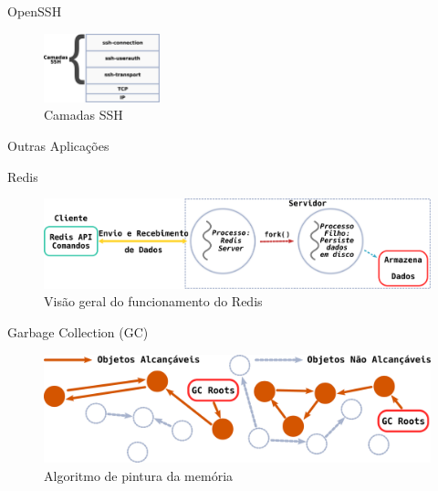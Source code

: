 \documentclass[xcolor={usenames,svgnames,dvipsnames},brazil,english,12pt,aspectratio=149]{beamer}
\begin{document}
\begin{frame}{OpenSSH}
	\begin{figure}[!h]
		\centering
		\includegraphics[width=0.3\textwidth]{ssh_layers}
		\caption{Camadas SSH}
		\label{fig:openssh_layer}
	\end{figure}
\end{frame}

\begin{frame}{Outras Aplicações}
\end{frame}

\begin{frame}{Redis}
	\begin{figure}[!h]
		\centering
		\includegraphics[width=\textwidth]{redis_overview}
		\caption{Visão geral do funcionamento do Redis}
		\label{fig:redis}
	\end{figure}
\end{frame}

\begin{frame}{Garbage Collection (GC)}
	\begin{figure}[!h]
		\centering
		\includegraphics[width=\textwidth]{gc_algoritmo}
		\caption{Algoritmo de pintura da memória}
		\label{fig:gc_alg}
	\end{figure}
\end{frame}
\end{document}
